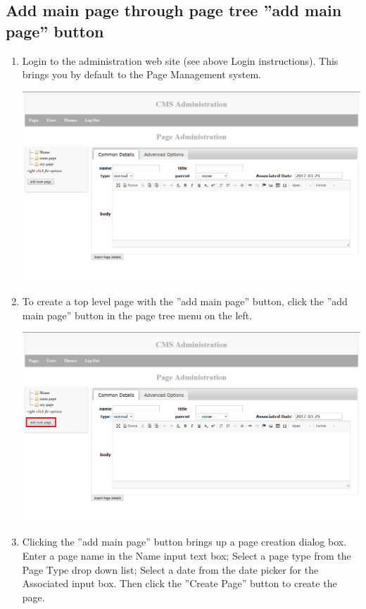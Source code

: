 \documentclass[12pt]{article}
\begin{document}
\subsection{Add main page through page tree ''add main page'' button}

\begin{enumerate}
  \item Login to the administration web site (see above Login instructions). This brings you by default to the Page Management system.
  
  \includegraphics[width=\textwidth,height=\textheight,keepaspectratio]{pics/mainPageButton_1.png}
  
  \item To create a top level page with the ''add main page'' button, click the ''add main page'' button in the page tree menu on the left.
  
  \includegraphics[width=\textwidth,height=\textheight,keepaspectratio]{pics/mainPageButton_2.png}
  
  \item Clicking the ''add main page'' button brings up a page creation dialog box. Enter a page name in the Name input text box; Select a page type from the Page Type drop down list; Select a date from the date picker for the Associated input box. Then click the ''Create Page'' button to create the page.
  

\end{enumerate}
\end{document}
